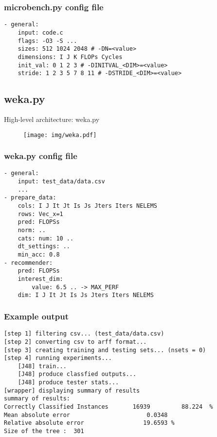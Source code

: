 \documentclass[xcolor=table,hideothersubsections,aspectratio=1610]{beamer}
\begin{document}
\begin{frame}[fragile]
\frametitle{microbench.py config file}
\begin{verbatim}
- general:
    input: code.c
    flags: -O3 -S ...
    sizes: 512 1024 2048 # -DN=<value>
    dimensions: I J K FLOPs Cycles
    init_val: 0 1 2 3 # -DINITVAL_<DIM>=<value>
    stride: 1 2 3 5 7 8 11 # -DSTRIDE_<DIM>=<value>
\end{verbatim}
\end{frame}


\subsection{weka.py}
\begin{frame}{High-level architecture: weka.py}
\begin{figure}
    \centering
    \texttt{[image: img/weka.pdf]}
\end{figure}
\end{frame}

\begin{frame}[fragile]
\frametitle{weka.py config file}
\begin{verbatim}
- general:
    input: test_data/data.csv
    ...
- prepare_data:
    cols: I J It Jt Is Js Jters Iters NELEMS
    rows: Vec_x=1
    pred: FLOPSs
    norm: ..
    cats: num: 10 ..
    dt_settings: ..
    min_acc: 0.8
- recommender:
    pred: FLOPSs
    interest_dim:
        value: 6.5 .. -> MAX_PERF
    dim: I J It Jt Is Js Jters Iters NELEMS
\end{verbatim}
\end{frame}

\begin{frame}[fragile]
\frametitle{Example output}
\begin{verbatim}
[step 1] filtering csv... (test_data/data.csv)
[step 2] converting csv to arff format...
[step 3] creating training and testing sets... (nsets = 0)
[step 4] running experiments...
    [J48] train... 
    [J48] produce classfied outputs... 
    [J48] produce tester stats... 
[wrapper] displaying summary of results
summary of results: 
Correctly Classified Instances       16939         88.224  %
Mean absolute error                      0.0348
Relative absolute error                 19.6593 %
Size of the tree : 	301

\end{verbatim}
\end{frame}
\end{document}
